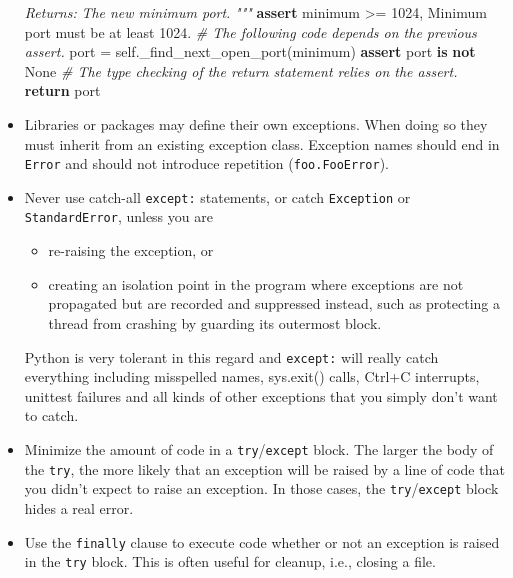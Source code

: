 \documentclass[
]{article}
\newenvironment{Shaded}{}{}
\newcommand{\CommentTok}[1]{\textcolor[rgb]{0.38,0.63,0.69}{\textit{#1}}}
\newcommand{\ControlFlowTok}[1]{\textcolor[rgb]{0.00,0.44,0.13}{\textbf{#1}}}
\newcommand{\DecValTok}[1]{\textcolor[rgb]{0.25,0.63,0.44}{#1}}
\newcommand{\KeywordTok}[1]{\textcolor[rgb]{0.00,0.44,0.13}{\textbf{#1}}}
\newcommand{\NormalTok}[1]{#1}
\newcommand{\OperatorTok}[1]{\textcolor[rgb]{0.40,0.40,0.40}{#1}}
\newcommand{\StringTok}[1]{\textcolor[rgb]{0.25,0.44,0.63}{#1}}
\newcommand{\VariableTok}[1]{\textcolor[rgb]{0.10,0.09,0.49}{#1}}
\providecommand{\tightlist}{%
  \setlength{\itemsep}{0pt}\setlength{\parskip}{0pt}}
\begin{document}
\begin{itemize}
\begin{samepage}
\begin{Shaded}
\begin{Highlighting}[]
\CommentTok{    Returns:}
\CommentTok{      The new minimum port.}
\CommentTok{    """}
    \ControlFlowTok{assert}\NormalTok{ minimum }\OperatorTok{\textgreater{}=} \DecValTok{1024}\NormalTok{, }\StringTok{\textquotesingle{}Minimum port must be at least 1024.\textquotesingle{}}
    \CommentTok{\# The following code depends on the previous assert.}
\NormalTok{    port }\OperatorTok{=} \VariableTok{self}\NormalTok{.\_find\_next\_open\_port(minimum)}
    \ControlFlowTok{assert}\NormalTok{ port }\KeywordTok{is} \KeywordTok{not} \VariableTok{None}
    \CommentTok{\# The type checking of the return statement relies on the assert.}
    \ControlFlowTok{return}\NormalTok{ port}
\end{Highlighting}
\end{Shaded}
\end{samepage}
\item
  Libraries or packages may define their own exceptions. When doing so
  they must inherit from an existing exception class. Exception names
  should end in \texttt{Error} and should not introduce repetition
  (\texttt{foo.FooError}).
\item
  Never use catch-all \texttt{except:} statements, or catch
  \texttt{Exception} or \texttt{StandardError}, unless you are

  \begin{itemize}
  \tightlist
  \item
    re-raising the exception, or
  \item
    creating an isolation point in the program where exceptions are not
    propagated but are recorded and suppressed instead, such as
    protecting a thread from crashing by guarding its outermost block.
  \end{itemize}

  Python is very tolerant in this regard and \texttt{except:} will
  really catch everything including misspelled names, sys.exit() calls,
  Ctrl+C interrupts, unittest failures and all kinds of other exceptions
  that you simply don't want to catch.
\item
  Minimize the amount of code in a \texttt{try}/\texttt{except} block.
  The larger the body of the \texttt{try}, the more likely that an
  exception will be raised by a line of code that you didn't expect to
  raise an exception. In those cases, the \texttt{try}/\texttt{except}
  block hides a real error.
\item
  Use the \texttt{finally} clause to execute code whether or not an
  exception is raised in the \texttt{try} block. This is often useful
  for cleanup, i.e., closing a file.
\end{itemize}
\end{document}
